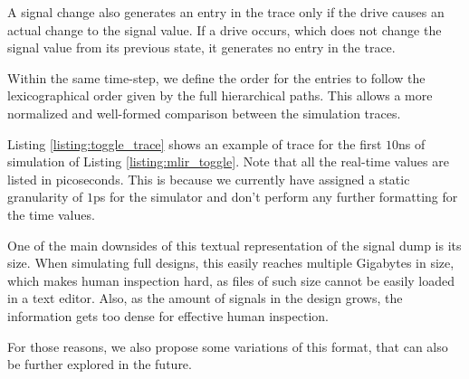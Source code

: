 A signal change also generates an entry in the trace only if the drive causes an actual change to the signal value. If a drive occurs, which does not change the signal value from its previous state, it generates no entry in the trace.

Within the same time-step, we define the order for the entries to follow the lexicographical order given by the full hierarchical paths. This allows a more normalized and well-formed comparison between the simulation traces.

Listing \ref{listing:toggle_trace} shows an example of trace for the first $10$ns of simulation of Listing \ref{listing:mlir_toggle}. Note that all the real-time values are listed in picoseconds. This is because we currently have assigned a static granularity of $1$ps for the simulator and don't perform any further formatting for the time values.


One of the main downsides of this textual representation of the signal dump is its size. When simulating full designs, this easily reaches multiple Gigabytes in size, which makes human inspection hard, as files of such size cannot be easily loaded in a text editor. Also, as the amount of signals in the design grows, the information gets too dense for effective human inspection.

For those reasons, we also propose some variations of this format, that can also be further explored in the future.

